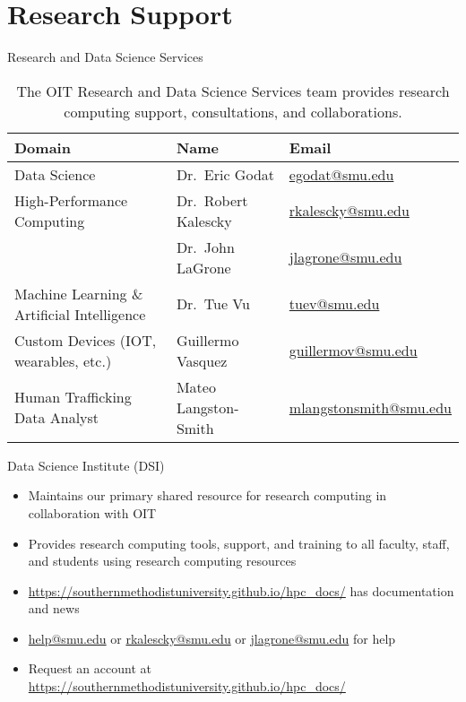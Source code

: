 \section{Research Support}

\begin{frame}{Research and Data Science Services}
\begin{table}
\small
\begin{tabularx}{\textwidth}{Xll}
\toprule
Domain & Name & Email \\
\midrule
Data Science & Dr.\ Eric Godat & \href{mailto:egodat@smu.edu}{egodat@smu.edu} \\
High-Performance Computing & Dr.\ Robert Kalescky & \href{mailto:rkalescky@smu.edu}{rkalescky@smu.edu} \\
& Dr.\ John LaGrone & \href{mailto:jlagrone@smu.edu}{jlagrone@smu.edu} \\
Machine Learning \& Artificial Intelligence & Dr.\ Tue Vu & \href{mailto:tuev@smu.edu}{tuev@smu.edu} \\
Custom Devices (IOT, wearables, etc.) & Guillermo Vasquez & \href{mailto:guillermov@smu.edu}{guillermov@smu.edu} \\
Human Trafficking Data Analyst & Mateo Langston-Smith & \href{mailto:mlangstonsmith@smu.edu}{mlangstonsmith@smu.edu} \\
\bottomrule
\end{tabularx}
\caption{The OIT Research and Data Science Services team provides research computing support, consultations, and collaborations.}
\end{table}
\end{frame}

\begin{frame}{Data Science Institute (DSI)}
\begin{itemize}
  \item Maintains our primary shared resource for research computing in collaboration with OIT
  \item Provides research computing tools, support, and training to all faculty, staff, and students using research computing resources
  \item \url{https://southernmethodistuniversity.github.io/hpc_docs/} has documentation and news
  \item \href{mailto:help@smu.edu}{help@smu.edu} or \href{mailto:rkalescky@smu.edu}{rkalescky@smu.edu} or \href{mailto:jlagrone@smu.edu}{jlagrone@smu.edu} for help
  \item Request an account at \url{https://southernmethodistuniversity.github.io/hpc_docs/}
\end{itemize}
\end{frame}

